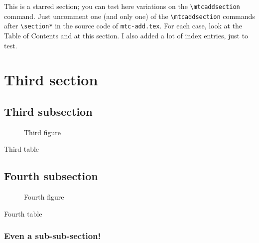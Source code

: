 \documentclass[oneside,12pt,a4paper]{article}
\begin{document}
This is a starred section; you can test here variations on
the \verb|\mtcaddsection| command. Just uncomment one (and
only one) of the \verb|\mtcaddsection| commands after
\verb|\section*| in the source code of \texttt{mtc-add.tex}.
For each case, look at the Table of Contents
and at this section.
%
%
%
%
%
%
%
%
%
%
I also added a lot of index entries, just to test.

\section{Third section}
\secttoc \mtcskip \sectlof \mtcskip \sectlot
\subsection{Third subsection}

\begin{figure} \caption{Third figure} \end{figure}
\begin{table} \caption{Third table} \end{table}

\subsection{Fourth subsection}

\begin{figure} \caption{Fourth figure} \end{figure}
\begin{table} \caption{Fourth table} \end{table}

\subsubsection{Even a sub-sub-section!}
\end{document}
